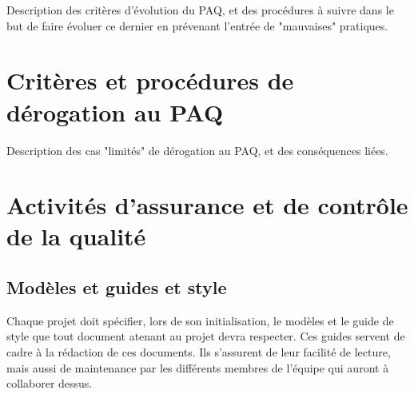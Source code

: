 \documentclass[a4paper, 18pt]{article}
\begin{document}
Description des critères d'évolution du PAQ, et des procédures à suivre dans le but de faire évoluer ce dernier en prévenant l'entrée de "mauvaises" pratiques.

\section{Critères et procédures de dérogation au PAQ}

Description des cas "limités" de dérogation au PAQ, et des conséquences liées.

%
%
%
%
%
%
%
%

\section{Activités d'assurance et de contrôle de la qualité}

\subsection{Modèles et guides et style}

Chaque projet doit spécifier, lors de son initialisation, le modèles et le guide de style que tout document atenant au projet devra respecter.
Ces guides servent de cadre à la rédaction de ces documents. Ils s'assurent de leur facilité de lecture, mais aussi de maintenance par les différents membres de l'équipe qui auront à collaborer dessus.
\end{document}
